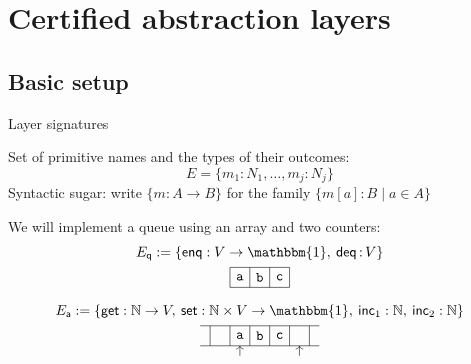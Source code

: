 \documentclass[aspectratio=141]{beamer}
\newcommand{\kw}[1]{\ensuremath{ \mathsf{#1} }}
\begin{document}

\section{Certified abstraction layers} \label{sec:cal} %

\subsection{Basic setup}

\begin{frame}{Layer signatures} %
  \begin{definition}[Signature]
  Set of primitive names and the types of their outcomes:
  \[
    E = \{ m_1 \mathop{:} N_1, \ldots, m_j \mathop{:} N_j \}
  \]
  Syntactic sugar:
  write $\{ m : A \rightarrow B \}$
  for the family $\{ m[a] : B \mid a \in A \}$
  \end{definition}
  \pause
  \begin{example}
    We will implement a queue using an array and two counters:
    \begin{gather*}
      E_\kw{q} := \{
        \kw{enq} : V \rightarrow \mathbbm{1}, \:
        \kw{deq} \mathop{:} V \}
      \\
      \begin{tikzpicture}[scale=0.5]
        \draw (0,0) grid (3,1);
        \node at (0.5,0.5) {$\mathtt{a}$};
        \node at (1.5,0.5) {$\mathtt{b}$};
        \node at (2.5,0.5) {$\mathtt{c}$};
      \end{tikzpicture}
      \\[1ex]
      E_\kw{a} := \{
        \kw{get} : \mathbb{N} \rightarrow V, \:
        \kw{set} : \mathbb{N} \times V \rightarrow \mathbbm{1}, \:
        \kw{inc}_1 : \mathbb{N}, \:
        \kw{inc}_2 : \mathbb{N} \}
      \\
      \begin{tikzpicture}[scale=0.5]
        \draw (-0.5,0) grid (5.5,1);
        \node at (1.5,0.5) {$\mathtt{a}$};
        \node at (2.5,0.5) {$\mathtt{b}$};
        \node at (3.5,0.5) {$\mathtt{c}$};
        \draw[->] (1.5,-0.5) -- (1.5,0);
        \draw[->] (4.5,-0.5) -- (4.5,0);
      \end{tikzpicture}
    \end{gather*}
  \end{example}
\end{frame}
\end{document}
